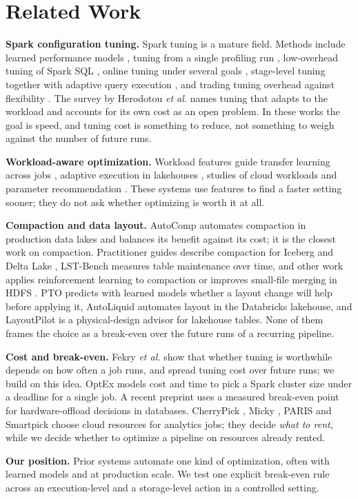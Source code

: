 \section{Related Work}
\label{sec:related}

\textbf{Spark configuration tuning.} Spark tuning is a mature field. Methods include learned
performance models \cite{nguyen2018tuning}, tuning from a single profiling run
\cite{buchaca2020yoro}, low-overhead tuning of Spark SQL \cite{xin2022locat}, online tuning
under several goals \cite{li2023online}, stage-level tuning together with adaptive query
execution \cite{lyu2024optimizer}, and trading tuning overhead against flexibility
\cite{li2025loftune}. The survey by Herodotou \emph{et al.} \cite{herodotou2020survey} names
tuning that adapts to the workload and accounts for its own cost as an open problem. In these
works the goal is speed, and tuning cost is something to reduce, not something to weigh
against the number of future runs.

\textbf{Workload-aware optimization.} Workload features guide transfer learning across jobs
\cite{shen2023rover}, adaptive execution in lakehouses \cite{xue2024aqe}, studies of cloud
workloads \cite{parayil2025workload} and parameter recommendation \cite{bao2018learning}.
These systems use features to find a faster setting sooner; they do not ask whether
optimizing is worth it at all.

\textbf{Compaction and data layout.} AutoComp \cite{gruenheid2025autocomp} automates
compaction in production data lakes and balances its benefit against its cost; it is the
closest work on compaction. Practitioner guides describe compaction for Iceberg and Delta Lake
\cite{goswami2023iceberg,delta2025compaction}, LST-Bench \cite{camacho2024lstbench} measures
table maintenance over time, and other work applies reinforcement learning to compaction
\cite{venkatesan2025autocompactionai} or improves small-file merging in HDFS
\cite{chettaoui2025merging}. PTO \cite{meduri2026pto} predicts with learned models whether a
layout change will help before applying it, AutoLiquid \cite{nakandala2026autoliquid}
automates layout in the Databricks lakehouse, and LayoutPilot \cite{liu2026layoutpilot} is a
physical-design advisor for lakehouse tables. None of them frames the choice as a break-even
over the future runs of a recurring pipeline.

\textbf{Cost and break-even.} Fekry \emph{et al.} \cite{fekry2020tune,fekry2020tuneful} show
that whether tuning is worthwhile depends on how often a job runs, and spread tuning cost over
future runs; we build on this idea. OptEx \cite{sidhanta2016optex} models cost and time to pick
a Spark cluster size under a deadline for a single job. A recent preprint
\cite{chang2026crosslayer} uses a measured break-even point for hardware-offload decisions in
databases. CherryPick \cite{alipourfard2017cherrypick}, Micky \cite{hsu2018micky}, PARIS
\cite{yadwadkar2017paris} and Smartpick \cite{mohapatra2023smartpick} choose cloud resources
for analytics jobs; they decide \emph{what to rent}, while we decide whether to optimize a
pipeline on resources already rented.

\textbf{Our position.} Prior systems automate one kind of optimization, often with learned
models and at production scale. We test one explicit break-even rule across an
execution-level and a storage-level action in a controlled setting.
